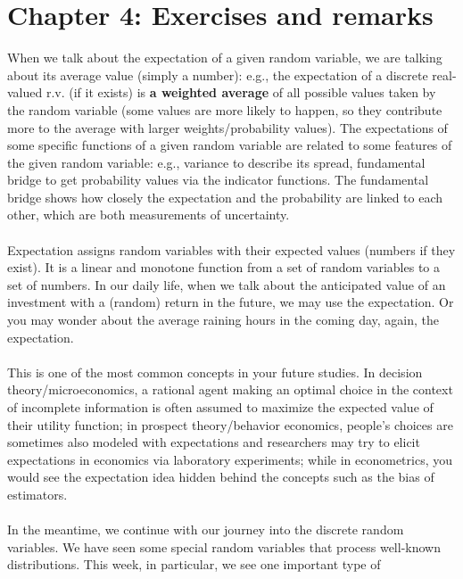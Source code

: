 

\chapter{Chapter 4: Exercises and remarks}
When we talk about the expectation of a given random variable, we are talking about its average value (simply
a number): e.g., the expectation of a discrete real-valued r.v. (if it exists) is \textbf{a weighted average} of all possible values taken
by the random variable (some values are more likely to happen, so they contribute more to the average with larger
weights/probability values). The expectations of some specific functions of a given random variable are related to some
features of the given random variable: e.g., variance to describe its spread, fundamental bridge to get probability values via
the indicator functions. The fundamental bridge shows how closely the expectation and the probability are linked to each other, which are both measurements of uncertainty.
\\~\\
Expectation assigns random variables with their expected values (numbers if they exist). It is a linear and monotone
function from a set of random variables to a set of numbers. In our daily life, when we talk about the anticipated value of an investment with a (random) return in the future, we may use the expectation. Or you may wonder about the average raining hours in the coming day, again, the expectation. \\~\\ 
This is one of the most common concepts in your future studies. In decision theory/microeconomics, a rational agent making an optimal choice in the context of incomplete information is often assumed to maximize the expected value of their utility function; in prospect theory/behavior economics, people's choices are sometimes also modeled with expectations and researchers may try to elicit expectations in economics via laboratory experiments; while in econometrics, you would see the expectation idea hidden behind the concepts such as the bias of estimators.~
\\~\\
In the meantime, we continue with our journey into the discrete random variables. We have seen some special random
variables that process well-known distributions. This week, in particular, we see one important type of

